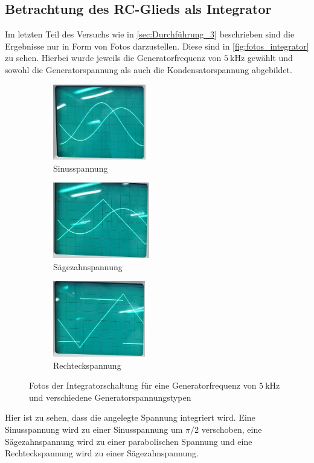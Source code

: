 \FloatBarrier
\newpage
\subsection{Betrachtung des RC-Glieds als Integrator}
\label{sec:Auswertung_Integrator}

Im letzten Teil des Versuchs wie in \autoref{sec:Durchführung_3} beschrieben sind die Ergebnisse nur in Form von Fotos darzustellen. Diese sind in \autoref{fig:fotos_integrator} zu sehen. Hierbei wurde jeweils die Generatorfrequenz von $\SI{5}{\kilo\hertz}$ gewählt und sowohl die Generatorspannung als auch die Kondensatorspannung abgebildet.

\begin{figure}
    \centering
    \begin{subfigure}{0.3\textwidth}
        \centering
        \includegraphics[height=3.3cm]{images/foto_03_ausschnitt.jpg}
        \caption{Sinusspannung}
        \label{fig:foto_sin_integrator}
    \end{subfigure}
    \begin{subfigure}{0.3\textwidth}
        \centering
        \includegraphics[height=3.3cm]{images/foto_04_ausschnitt.jpg}
        \caption{Sägezahnspannung}
        \label{fig:foto_saege_integrator}
    \end{subfigure}
    \begin{subfigure}{0.3\textwidth}
        \centering
        \includegraphics[height=3.3cm]{images/foto_05_ausschnitt.jpg}
        \caption{Rechteckspannung}
        \label{fig:foto_rechteck_integrator}
    \end{subfigure}
    \caption{Fotos der Integratorschaltung für eine Generatorfrequenz von $\SI{5}{\kilo\hertz}$ und verschiedene Generatorspannungstypen}
    \label{fig:fotos_integrator}
\end{figure}

Hier ist zu sehen, dass die angelegte Spannung integriert wird. Eine Sinusspannung wird zu einer Sinusspannung um $\pi/2$ verschoben, eine Sägezahnspannung wird zu einer parabolischen Spannung und eine Rechteckspannung wird zu einer Sägezahnspannung.